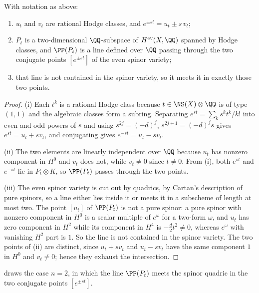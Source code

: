 \begin{theorem}\label{thm:plane}
With notation as above:
\begin{enumerate}[label=\textup{(\roman*)}]
\item $u_{t}$ and $v_{t}$ are rational Hodge classes, and
  $e^{\pm st}=u_{t}\pm s\,v_{t}$;
\item $P_{t}$ is a two-dimensional $\QQ$-subspace of $H^{\mathrm{ev}}(X,\QQ)$
  spanned by Hodge classes, and $\PP(P_{t})$ is a line defined over $\QQ$
  passing through the two conjugate points $[e^{\pm st}]$ of the even spinor
  variety;
\item that line is not contained in the spinor variety, so it meets it in
  exactly those two points.
\end{enumerate}
\end{theorem}

\begin{proof}
(i) Each $t^{k}$ is a rational Hodge class because $t\in\NS(X)\otimes\QQ$ is
of type $(1,1)$ and the algebraic classes form a subring. Separating
$e^{st}=\sum_{k}s^{k}t^{k}/k!$ into even and odd powers of $s$ and using
$s^{2j}=(-d)^{j}$, $s^{2j+1}=(-d)^{j}s$ gives $e^{st}=u_{t}+sv_{t}$, and
conjugating gives $e^{-st}=u_{t}-sv_{t}$.

(ii) The two elements are linearly independent over $\QQ$ because $u_{t}$ has
nonzero component in $H^{0}$ and $v_{t}$ does not, while $v_{t}\ne0$ since
$t\ne0$. From (i), both $e^{st}$ and $e^{-st}$ lie in $P_{t}\otimes K$, so
$\PP(P_{t})$ passes through the two points.

(iii) The even spinor variety is cut out by quadrics, by Cartan's description
of pure spinors, so a line either lies inside it or meets it in a subscheme of
length at most two. The point $[u_{t}]$ of $\PP(P_{t})$ is not a pure spinor:
a pure spinor with nonzero component in $H^{0}$ is a scalar multiple of
$e^{\omega}$ for a two-form $\omega$, and $u_{t}$ has zero component in
$H^{2}$ while its component in $H^{4}$ is $-\tfrac{d}{2}t^{2}\ne0$, whereas
$e^{\omega}$ with vanishing $H^{2}$ part is $1$. So the line is not contained
in the spinor variety. The two points of (ii) are distinct, since
$u_{t}+sv_{t}$ and $u_{t}-sv_{t}$ have the same component $1$ in $H^{0}$ and
$v_{t}\ne0$; hence they exhaust the intersection.
\end{proof}

 draws the case $n=2$, in which the line $\PP(P_{t})$
meets the spinor quadric in the two conjugate points $[e^{\pm st}]$.


